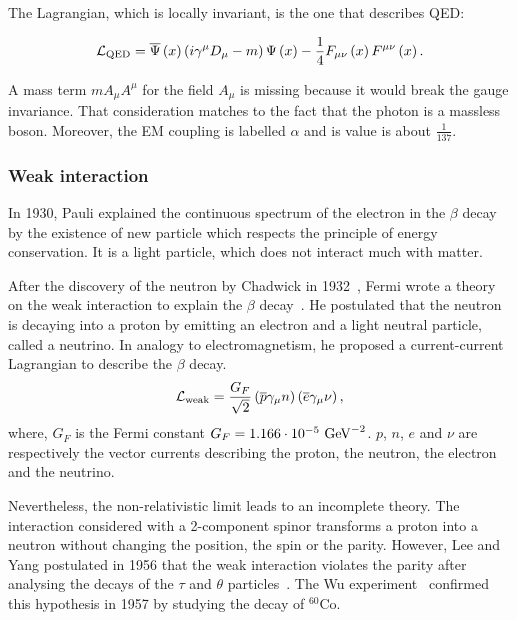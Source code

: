       The Lagrangian, which is locally invariant, is the one that describes \gls{QED}:

      \begin{equation}
          \mathcal{L}_{\rm{QED}} =  \overline{\Psi}\left(x\right)\left( i \gamma^\mu D_\mu - m \right) \Psi\left(x\right) - \frac{1}{4}F_{\mu \nu}\left(x\right) F^{\mu \nu}\left(x\right).
      \end{equation}

      A mass term $m A_{\mu} A^{\mu}$ for the field $A_{\mu}$ is missing because it would break the gauge invariance.
      That consideration matches to the fact that the photon is a massless boson.
      Moreover, the \gls{EM} coupling is labelled $\alpha$ and is value is about $\frac{1}{137}$.

    \subsubsection{Weak interaction}

    In 1930, Pauli explained the continuous spectrum of the electron in the $\beta$ decay by the existence of new particle which respects the principle of energy conservation.
    It is a light particle, which does not interact much with matter.

    After the discovery of the neutron by Chadwick in 1932~\cite{chadwick1932possible}, Fermi wrote a theory on the weak interaction to explain the $\beta$ decay~\cite{Fermi:1934hr}. 
    He postulated that the neutron is decaying into a proton by emitting an electron and a light neutral particle, called a neutrino.
    In analogy to electromagnetism, he proposed a current-current Lagrangian to describe the $\beta$ decay.
    \begin{equation}
      \mathcal{L}_{\rm{weak}} = \frac{G_F}{\sqrt{2}}\left(\overline{p} \gamma_{\mu} n \right) \left(\overline{e} \gamma_{\mu} \nu \right),
    \end{equation}
    where, $G_F$ is the Fermi constant $G_F = 1.166 \cdot 10^{-5}~\rm{GeV}^{-2}$. $p$, $n$, $e$ and $\nu$ are respectively the vector currents describing the proton, the neutron, the electron and the neutrino. 
    
    Nevertheless, the non-relativistic limit leads to an incomplete theory.
    The interaction considered with a 2-component spinor transforms a proton into a neutron without changing the position, the spin or the parity.
    However, Lee and Yang postulated in 1956 that the weak interaction violates the parity after analysing the decays of the $\tau$ and $\theta$ particles~\cite{1956PhRv..104..254L}.
    The Wu experiment~\cite{1957PhRv..105.1413W} confirmed this hypothesis in 1957 by studying the decay of $^{60}$Co.

